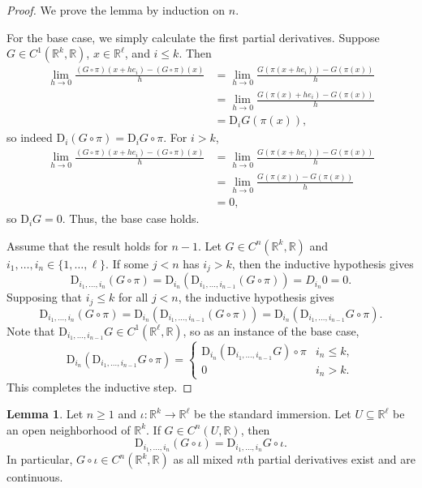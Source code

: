 \documentclass[12pt]{article}
\theoremstyle{definition}
\newtheorem{lemma}{Lemma}
\newcommand{\R}{\mathbb{R}}
\newcommand{\<}{\langle}
\renewcommand{\>}{\rangle}
\newcommand{\seq}{\subseteq}
\newcommand{\DD}{\mathrm{D}}
\begin{document}
\begin{proof}
    We prove the lemma by induction on $n$.

    For the base case, we simply calculate the first partial derivatives.
    Suppose $G \in C^1(\R^k, \R)$, $x \in \R^\ell$, and $i \leq k$.
    Then
    \begin{align*}
        \lim_{h \to 0} \frac{(G \circ \pi)(x + he_i) - (G \circ \pi)(x)}{h}
            &= \lim_{h \to 0} \frac{G(\pi(x + he_i)) - G(\pi(x))}{h} \\
            &= \lim_{h \to 0} \frac{G(\pi(x) + he_i) - G(\pi(x))}{h} \\
            &= \DD_i G(\pi(x)),
    \end{align*}
    so indeed $\DD_i (G \circ \pi) = \DD_i G \circ \pi$.
    For $i > k$,
    \begin{align*}
        \lim_{h \to 0} \frac{(G \circ \pi)(x + he_i) - (G \circ \pi)(x)}{h}
            &= \lim_{h \to 0} \frac{G(\pi(x + he_i)) - G(\pi(x))}{h} \\
            &= \lim_{h \to 0} \frac{G(\pi(x)) - G(\pi(x))}{h} \\
            &= 0,
    \end{align*}
    so $\DD_i G = 0$.
    Thus, the base case holds.

    Assume that the result holds for $n-1$.
    Let $G \in C^n(\R^k, \R)$ and $i_1, \dots, i_n \in \{1, \dots, \ell\}$.
    If some $j < n$ has $i_j > k$, then the inductive hypothesis gives
    \[
        \DD_{i_1, \dots, i_n} (G \circ \pi)
            = \DD_{i_n}(\DD_{i_1, \dots, i_{n-1}} (G \circ \pi))
            = D_{i_n} 0
            = 0.
    \]
    Supposing that $i_j \leq k$ for all $j < n$, the inductive hypothesis gives
    \[
        \DD_{i_1, \dots, i_n} (G \circ \pi)
            = \DD_{i_n}(\DD_{i_1, \dots, i_{n-1}} (G \circ \pi))
            = \DD_{i_n}(\DD_{i_1, \dots, i_{n-1}} G \circ \pi).
    \]
    Note that $\DD_{i_1, \dots, i_{n-1}} G \in C^1(\R^\ell, \R)$,
    so as an instance of the base case,
    \[
        \DD_{i_n}(\DD_{i_1, \dots, i_{n-1}} G \circ \pi) = \begin{cases}
            \DD_{i_n}(\DD_{i_1, \dots, i_{n-1}} G) \circ \pi & i_n \leq k, \\
            0 & i_n > k.
        \end{cases}
    \]
    This completes the inductive step.
\end{proof}

\begin{lemma}
    Let $n \geq 1$ and $\iota : \R^k \to \R^\ell$ be the standard immersion.
    Let $U \seq \R^\ell$ be an open neighborhood of $\R^k$.
    If $G \in C^n(U, \R)$, then
    \[
        \DD_{i_1, \dots, i_n} (G \circ \iota) = \DD_{i_1, \dots, i_n} G \circ \iota.
    \]
    In particular, $G \circ \iota \in C^n(\R^k, \R)$ as all mixed $n$th partial derivatives exist and are continuous.
\end{lemma}
\end{document}
